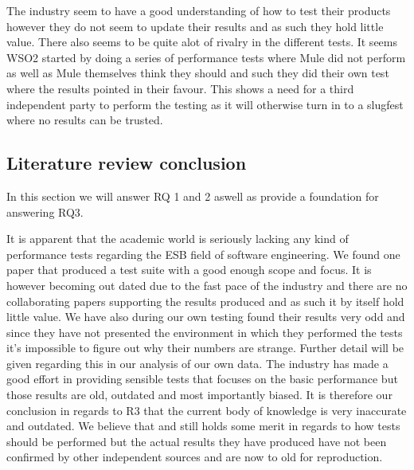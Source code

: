 The industry seem to have a good understanding of how to test their products however they do not seem to update their results and as such they hold little value.
There also seems to be quite alot of rivalry in the different tests. 
It seems WSO2 started by doing a series of performance tests where Mule did not perform as well as Mule themselves think they should and such they did their own test where the results pointed in their favour.
This shows a need for a third independent party to perform the testing as it will otherwise turn in to a slugfest where no results can be trusted. 


\subsection{Literature review conclusion}
In this section we will answer RQ 1 and 2 aswell as provide a foundation for answering RQ3.

It is apparent that the academic world is seriously lacking any kind of performance tests regarding the ESB field of software engineering. 
We found one paper\cite{Sanjay2011} that produced a test suite with a good enough scope and focus. 
It is however becoming out dated due to the fast pace of the industry and there are no collaborating papers supporting the results produced and as such it by itself hold little value. 
We have also during our own testing found their results very odd and since they have not presented the environment in which they performed the tests it's impossible to figure out why their numbers are strange. 
Further detail will be given regarding this in our analysis of our own data. %
The industry has made a good effort in providing sensible tests that focuses on the basic performance but those results are old, outdated and most importantly biased. 
It is therefore our conclusion in regards to R3 that the current body of knowledge is very inaccurate and outdated. 
We believe that \cite{Sanjay2011} and \cite{Perera07,Perera07R2,Perera07R3,mulesoft08}still holds some merit in regards to how tests should be performed but the actual results they have produced have not been confirmed by other independent sources and are now to old for reproduction.
